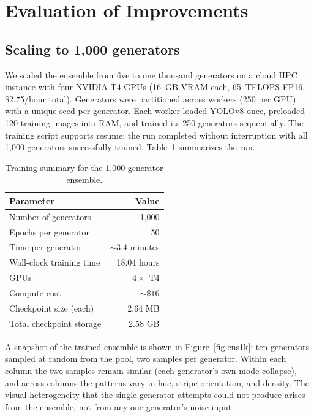 \documentclass[conference]{IEEEtran}
\begin{document}
\section{Evaluation of Improvements}
\label{sec:eval}

\subsection{Scaling to 1{,}000 generators}
\label{ssec:scale}

We scaled the ensemble from five to one thousand generators on a cloud
HPC instance with four NVIDIA T4 GPUs (16~GB VRAM each, 65~TFLOPS FP16,
\$2.75/hour total). Generators were partitioned across workers (250 per
GPU) with a unique seed per generator. Each worker loaded YOLOv8 once,
preloaded 120 training images into RAM, and trained its 250 generators
sequentially. The training script supports resume; the run completed
without interruption with all 1{,}000 generators successfully trained.
Table~\ref{tab:hpc} summarizes the run.

\begin{table}[!t]
\caption{Training summary for the 1{,}000-generator ensemble.}
\label{tab:hpc}
\centering
\renewcommand{\arraystretch}{1.15}
\begin{tabular}{lr}
\toprule
\textbf{Parameter} & \textbf{Value} \\
\midrule
Number of generators        & 1{,}000 \\
Epochs per generator        & 50 \\
Time per generator          & ${\sim}3.4$ minutes \\
Wall-clock training time    & 18.04 hours \\
GPUs                        & $4\times$ T4 \\
Compute cost                & ${\sim}\$16$ \\
Checkpoint size (each)      & 2.64 MB \\
Total checkpoint storage    & 2.58 GB \\
\bottomrule
\end{tabular}
\end{table}

A snapshot of the trained ensemble is shown in Figure~\ref{fig:ens1k}:
ten generators sampled at random from the pool, two samples per
generator. Within each column the two samples remain similar (each
generator's own mode collapse), and across columns the patterns vary in
hue, stripe orientation, and density. The visual heterogeneity that the
single-generator attempts could not produce arises from the ensemble, not
from any one generator's noise input.
\end{document}
